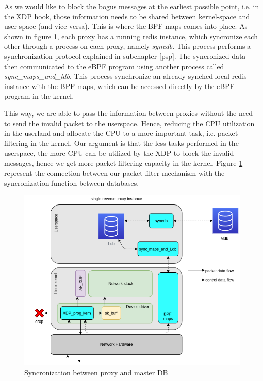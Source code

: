 \documentclass[sigplan,screen]{acmart}
\begin{document}
As we would like to block the bogus messages at the earliest possible point, i.e. in the XDP hook, those information needs to be shared between kernel-space and user-space (and vice versa). This is where the BPF maps comes into place. As shown in figure \ref{proxies_xdp}, each proxy has a running redis instance, which syncronize each other through a process on each proxy, namely \textit{syncdb}. This process performs a synchronization protocol explained in subchapter \ref{psp}. The syncronized data then communicated to the eBPF program using another process called \textit{sync\_maps\_and\_ldb}. This process synchronize an already synched local redis instance with the BPF maps, which can be accessed directly by the eBPF program in the kernel.  

This way, we are able to pass the information between proxies without the need to send the invalid packet to the userspace. Hence, reducing the CPU utilization in the userland and allocate the CPU to a more important task, i.e. packet filtering in the kernel. Our argument is that the less tasks performed in the userspace, the more CPU can be utilized by the XDP to block the invalid messages, hence we get more packet filtering capacity in the kernel. Figure \ref{proxies_xdp} represent the connection between our packet filter mechanism with the syncronization function between databases.

\begin{figure}[htbp]
\centerline{\includegraphics[scale=0.35]{pic/proxies_xdp.png}}
\caption{Syncronization between proxy and master DB}
\label{proxies_xdp}
\end{figure}
\end{document}
